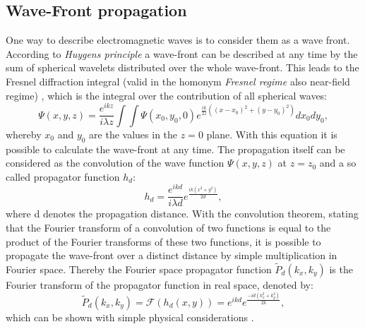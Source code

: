 \subsection{Wave-Front propagation}\label{subsec:wp}
One way to describe electromagnetic waves is to consider them as a wave front.
According to \textit{Huygens principle} a wave-front can be described at any time by the sum of spherical wavelets distributed over the whole wave-front. This leads to the Fresnel diffraction integral (valid in the homonym \textit{Fresnel regime} also near-field regime) , which is the integral over the contribution of all spherical waves:
\begin{equation}
\Psi (x,y,z) = \frac{e^{ikz}}{i\lambda z} \int\int \Psi(x_{0},y_{0},0)e^{\frac{ik}{2z}((x-x_{0})^{2}+(y-y_{0})^{2})} dx_{0}dy_{0} ,
\end{equation}
whereby $x_{0}$ and $y_{0}$ are the values in the $z = 0$ plane. With this equation it is possible to calculate the wave-front at any time. The propagation itself can be considered as the convolution of the wave function $\Psi(x,y,z)$ at $z = z_{0}$ and a so called propagator function $h_{d}$:
\begin{equation}
h_{d} = \frac{e^{ikd}}{i\lambda d} e^{\frac{ik(x^{2}+y^{2})}{2d}} , 
\end{equation}
where d denotes the propagation distance. With the convolution theorem, stating that the Fourier transform of a convolution of two functions is equal to the product of the Fourier transforms of these two functions, it is possible to propagate the wave-front over a distinct distance by simple multiplication in Fourier space. Thereby the Fourier space propagator function $\tilde{P}_{d}(k_{x},k_{y})$ is the Fourier transform  of the propagator function in real space, denoted by:
\begin{equation}
\tilde{P}_{d}(k_{x},k_{y}) = \mathcal{F}(h_{d}(x,y)) = e^{ikd}e^{\frac{-id(k_{x}^{2}+k_{y}^{2})}{2k}} ,
\end{equation}\label{propfunc}
which can be shown with simple physical considerations \citep{Bech2009}.  
